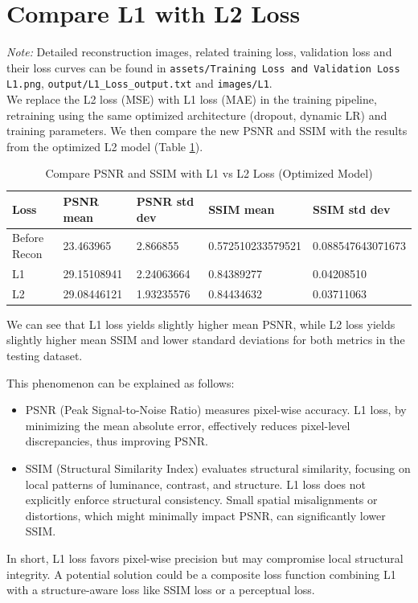 \documentclass{article}
\begin{document}
\section{Compare L1 with L2 Loss}
\textit{Note: }Detailed reconstruction images, related training loss, validation loss and their
loss curves can be found in \texttt{assets/Training Loss and Validation Loss L1.png},
\texttt{output/L1\_Loss\_output.txt} and \texttt{images/L1}.\\
We replace the L2 loss (MSE) with L1 loss (MAE) in the training pipeline, retraining using the same optimized architecture (dropout, dynamic LR) and training parameters. We then compare the new PSNR and SSIM with the results from the optimized L2 model (Table \ref{tab:loss_compare}).

\begin{table}[H]
  \caption{Compare PSNR and SSIM with L1 vs L2 Loss (Optimized Model)}
  \label{tab:loss_compare}
  \centering
  \begin{tabular}{lllll}
    \toprule
    Loss & PSNR mean   & PSNR std dev & SSIM mean  & SSIM std dev \\
    \midrule
    Before Recon    & 23.463965 & 2.866855 & 0.572510233579521 & 0.088547643071673 \\
    L1   & 29.15108941 & 2.24063664   & 0.84389277 & 0.04208510   \\
    L2   & 29.08446121 & 1.93235576   & 0.84434632 & 0.03711063   \\
    \bottomrule
  \end{tabular}
\end{table}

We can see that L1 loss yields slightly higher mean PSNR, while L2 loss yields slightly higher mean SSIM and lower standard deviations for both metrics in the testing dataset.

This phenomenon can be explained as follows:
\begin{itemize}
  \item PSNR (Peak Signal-to-Noise Ratio) measures pixel-wise accuracy. L1 loss, by minimizing the mean absolute error, effectively reduces pixel-level discrepancies, thus improving PSNR.
  \item SSIM (Structural Similarity Index) evaluates structural similarity, focusing on local patterns of luminance, contrast, and structure. L1 loss does not explicitly enforce structural consistency. Small spatial misalignments or distortions, which might minimally impact PSNR, can significantly lower SSIM.
\end{itemize}
In short, L1 loss favors pixel-wise precision but may compromise local structural integrity. A potential solution could be a composite loss function combining L1 with a structure-aware loss like SSIM loss or a perceptual loss.
\end{document}

